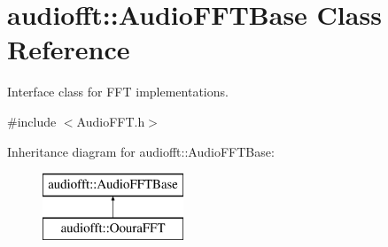 \hypertarget{classaudiofft_1_1_audio_f_f_t_base}{}\section{audiofft\+:\+:Audio\+F\+F\+T\+Base Class Reference}
\label{classaudiofft_1_1_audio_f_f_t_base}


Interface class for F\+FT implementations.  




{\ttfamily \#include $<$Audio\+F\+F\+T.\+h$>$}

Inheritance diagram for audiofft\+:\+:Audio\+F\+F\+T\+Base\+:\begin{figure}[H]
\begin{center}
\leavevmode
\includegraphics[height=2.000000cm]{classaudiofft_1_1_audio_f_f_t_base}
\end{center}
\end{figure}
